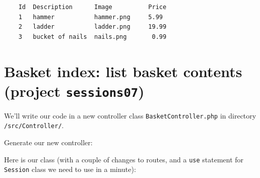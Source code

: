 \documentclass[a4paperpaper,openright]{book}
\newenvironment{Shaded}{}{}
\newcommand{\AnnotationTok}[1]{\textcolor[rgb]{0.38,0.63,0.69}{\textbf{\textit{#1}}}}
\newcommand{\CommentTok}[1]{\textcolor[rgb]{0.38,0.63,0.69}{\textit{#1}}}
\newcommand{\ExtensionTok}[1]{#1}
\newcommand{\KeywordTok}[1]{\textcolor[rgb]{0.00,0.44,0.13}{\textbf{#1}}}
\newcommand{\NormalTok}[1]{#1}
\newcommand{\OtherTok}[1]{\textcolor[rgb]{0.00,0.44,0.13}{#1}}
\newcommand{\StringTok}[1]{\textcolor[rgb]{0.25,0.44,0.63}{#1}}
\begin{document}
\begin{verbatim}
    Id  Description      Image          Price
    1   hammer           hammer.png     5.99
    2   ladder           ladder.png     19.99
    3   bucket of nails  nails.png       0.99
\end{verbatim}

\hypertarget{basket-index-list-basket-contents-project-sessions07}{%
\section{\texorpdfstring{Basket index: list basket contents (project
\texttt{sessions07})}{Basket index: list basket contents (project sessions07)}}\label{basket-index-list-basket-contents-project-sessions07}}

We'll write our code in a new controller class
\texttt{BasketController.php} in directory \texttt{/src/Controller/}.

Generate our new controller:

\begin{Shaded}
\end{Shaded}

Here is our class (with a couple of changes to routes, and a
\texttt{use} statement for \texttt{Session} class we need to use in a
minute):

\begin{Shaded}
\end{Shaded}
\end{document}
